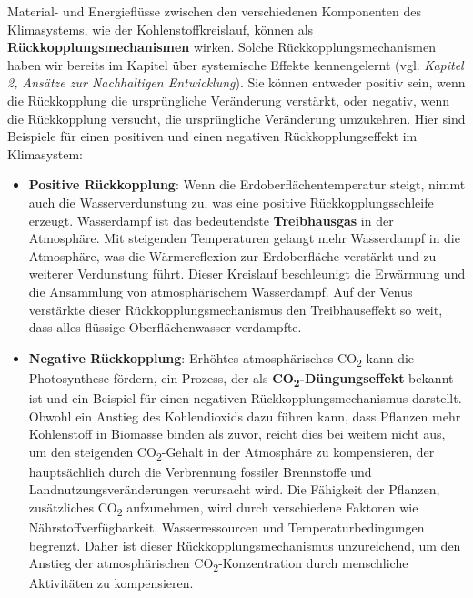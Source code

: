 \documentclass[
  nswissgerman,
  a4paper,
  DIV=11,
  numbers=noendperiod,
  oneside,
  openany]{scrreprt}
\begin{document}
Material- und Energieflüsse zwischen den verschiedenen Komponenten des
Klimasystems, wie der Kohlenstoffkreislauf, können als
\textbf{Rückkopplungsmechanismen} wirken. Solche
Rückkopplungsmechanismen haben wir bereits im Kapitel über systemische
Effekte kennengelernt (vgl. \emph{Kapitel 2, Ansätze zur Nachhaltigen
Entwicklung}). Sie können entweder positiv sein, wenn die Rückkopplung
die ursprüngliche Veränderung verstärkt, oder negativ, wenn die
Rückkopplung versucht, die ursprüngliche Veränderung umzukehren. Hier
sind Beispiele für einen positiven und einen negativen
Rückkopplungseffekt im Klimasystem:

\begin{itemize}
\item
  \textbf{Positive Rückkopplung}: Wenn die Erdoberflächentemperatur
  steigt, nimmt auch die Wasserverdunstung zu, was eine positive
  Rückkopplungsschleife erzeugt. Wasserdampf ist das bedeutendste
  \textbf{Treibhausgas} in der Atmosphäre. Mit steigenden Temperaturen
  gelangt mehr Wasserdampf in die Atmosphäre, was die Wärmereflexion zur
  Erdoberfläche verstärkt und zu weiterer Verdunstung führt. Dieser
  Kreislauf beschleunigt die Erwärmung und die Ansammlung von
  atmosphärischem Wasserdampf. Auf der Venus verstärkte dieser
  Rückkopplungsmechanismus den Treibhauseffekt so weit, dass alles
  flüssige Oberflächenwasser verdampfte.
\item
  \textbf{Negative Rückkopplung}: Erhöhtes atmosphärisches
  CO\textsubscript{2} kann die Photosynthese fördern, ein Prozess, der
  als \textbf{CO\textsubscript{2}-Düngungseffekt} bekannt ist und ein
  Beispiel für einen negativen Rückkopplungsmechanismus darstellt.
  Obwohl ein Anstieg des Kohlendioxids dazu führen kann, dass Pflanzen
  mehr Kohlenstoff in Biomasse binden als zuvor, reicht dies bei weitem
  nicht aus, um den steigenden CO\textsubscript{2}-Gehalt in der
  Atmosphäre zu kompensieren, der hauptsächlich durch die Verbrennung
  fossiler Brennstoffe und Landnutzungsveränderungen verursacht wird.
  Die Fähigkeit der Pflanzen, zusätzliches CO\textsubscript{2}
  aufzunehmen, wird durch verschiedene Faktoren wie
  Nährstoffverfügbarkeit, Wasserressourcen und Temperaturbedingungen
  begrenzt. Daher ist dieser Rückkopplungsmechanismus unzureichend, um
  den Anstieg der atmosphärischen CO\textsubscript{2}-Konzentration
  durch menschliche Aktivitäten zu kompensieren.
\end{itemize}
\end{document}
